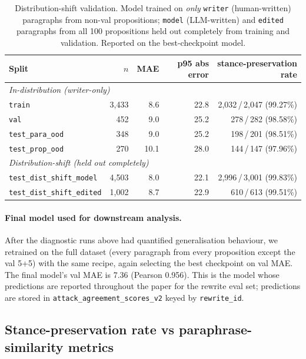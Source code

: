 \begin{table}[h]
  \centering\small
  \caption{Distribution-shift validation. Model trained on \emph{only} \texttt{writer} (human-written) paragraphs from non-val propositions; \texttt{model} (LLM-written) and \texttt{edited} paragraphs from all 100 propositions held out completely from training and validation. Reported on the best-checkpoint model.}
  \label{tab:agreement-dist-shift}
  \begin{tabular}{lrrrr}
    \toprule
    Split & $n$ & MAE & p95 abs error & stance-preservation rate \\
    \midrule
    \multicolumn{5}{l}{\emph{In-distribution (writer-only)}} \\
    \texttt{train} & 3{,}433 & 8.6 & 22.8 & 2{,}032\,/\,2{,}047 (99.27\%) \\
    \texttt{val} & 452 & 9.0 & 25.2 & 278\,/\,282 (98.58\%) \\
    \texttt{test\_para\_ood} & 348 & 9.0 & 25.2 & 198\,/\,201 (98.51\%) \\
    \texttt{test\_prop\_ood} & 270 & 10.1 & 28.0 & 144\,/\,147 (97.96\%) \\
    \midrule
    \multicolumn{5}{l}{\emph{Distribution-shift (held out completely)}} \\
    \texttt{test\_dist\_shift\_model} & 4{,}503 & 8.0 & 22.1 & 2{,}996\,/\,3{,}001 (99.83\%) \\
    \texttt{test\_dist\_shift\_edited} & 1{,}002 & 8.7 & 22.9 & 610\,/\,613 (99.51\%) \\
    \bottomrule
  \end{tabular}
\end{table}

\paragraph{Final model used for downstream analysis.}
After the diagnostic runs above had quantified generalisation behaviour, we retrained on the full dataset (every paragraph from every proposition except the val 5+5) with the same recipe, again selecting the best checkpoint on val MAE. The final model's val MAE is 7.36 (Pearson 0.956). This is the model whose predictions are reported throughout the paper for the rewrite eval set; predictions are stored in \texttt{attack\_agreement\_scores\_v2} keyed by \texttt{rewrite\_id}.


\subsection{Stance-preservation rate vs paraphrase-similarity metrics}\label{app:preservation-similarity}

